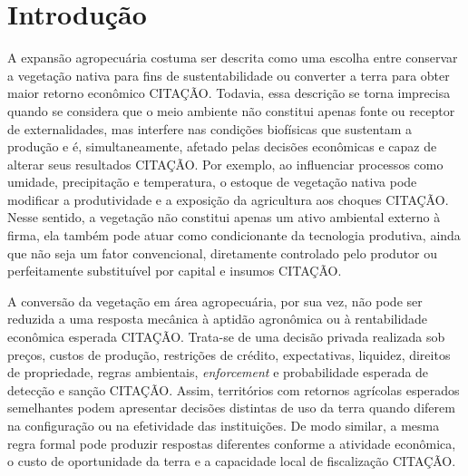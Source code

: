 
\section{Introdução}
\label{sec:introducao}


A expansão agropecuária costuma ser descrita como uma escolha entre conservar a vegetação nativa para fins de sustentabilidade ou converter a terra para obter maior retorno econômico {CITAÇÃO}. Todavia, essa descrição se torna imprecisa quando se considera que o meio ambiente não constitui apenas fonte ou receptor de externalidades, mas interfere nas condições biofísicas que sustentam a produção e é, simultaneamente, afetado pelas decisões econômicas e capaz de alterar seus resultados {CITAÇÃO}. Por exemplo, ao influenciar processos como umidade, precipitação e temperatura, o estoque de vegetação nativa pode modificar a produtividade e a exposição da agricultura aos choques {CITAÇÃO}. Nesse sentido, a vegetação não constitui apenas um ativo ambiental externo à firma, ela também pode atuar como condicionante da tecnologia produtiva, ainda que não seja um fator convencional, diretamente controlado pelo produtor ou perfeitamente substituível por capital e insumos {CITAÇÃO}.

A conversão da vegetação em área agropecuária, por sua vez, não pode ser reduzida a uma resposta mecânica à aptidão agronômica ou à rentabilidade econômica esperada {CITAÇÃO}. Trata-se de uma decisão privada realizada sob preços, custos de produção, restrições de crédito, expectativas, liquidez, direitos de propriedade, regras ambientais, \textit{enforcement} e probabilidade esperada de detecção e sanção {CITAÇÃO}. Assim,  territórios com retornos agrícolas esperados semelhantes podem apresentar decisões distintas de uso da terra quando diferem na configuração ou na efetividade das instituições. De modo similar, a mesma regra formal pode produzir respostas diferentes conforme a atividade econômica, o custo de oportunidade da terra e a capacidade local de fiscalização {CITAÇÃO}.

